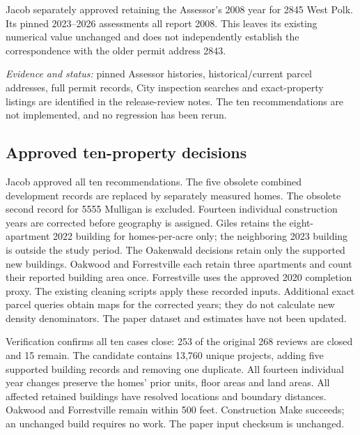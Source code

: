 Jacob separately approved retaining the Assessor's 2008 year for 2845 West Polk. Its pinned 2023--2026 assessments all report 2008. This leaves its existing numerical value unchanged and does not independently establish the correspondence with the older permit address 2843.

\textit{Evidence and status:} pinned Assessor histories, historical/current parcel addresses, full permit records, City inspection searches and exact-property listings are identified in the release-review notes. The ten recommendations are not implemented, and no regression has been rerun.

\subsection*{Approved ten-property decisions}
Jacob approved all ten recommendations. The five obsolete combined development
records are replaced by separately measured homes. The obsolete second record
for 5555 Mulligan is excluded. Fourteen individual construction years are
corrected before geography is assigned. Giles retains the eight-apartment 2022
building for homes-per-acre only; the neighboring 2023 building is outside the
study period. The Oakenwald decisions retain only the supported new buildings.
Oakwood and Forrestville each retain three apartments and count their reported
building area once. Forrestville uses the approved 2020 completion proxy.
The existing cleaning scripts apply these recorded inputs. Additional exact
parcel queries obtain maps for the corrected years; they do not calculate new
density denominators. The paper dataset and estimates have not been updated.

Verification confirms all ten cases close: 253 of the original 268 reviews are
closed and 15 remain. The candidate contains 13,760 unique projects, adding five
supported building records and removing one duplicate. All fourteen individual
year changes preserve the homes' prior units, floor areas and land areas. All
affected retained buildings have resolved locations and boundary distances.
Oakwood and Forrestville remain within 500 feet. Construction Make succeeds;
an unchanged build requires no work. The paper input checksum is unchanged.

